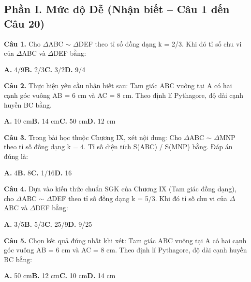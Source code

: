 \documentclass[11pt,a4paper]{article}
\begin{document}
\subsection*{\color{accent} Phần I. Mức độ Dễ (Nhận biết -- Câu 1 đến Câu 20)}
\textbf{\color{primary} Câu 1.} Cho $\Delta$ABC $\sim$ $\Delta$DEF theo tỉ số đồng dạng k = 2/3. Khi đó tỉ số chu vi của $\Delta$ABC và $\Delta$DEF bằng:\par
\hspace*{1.5em}\textbf{A.} 4/9\quad\quad \textbf{B.} 2/3\quad\quad \textbf{C.} 3/2\quad\quad \textbf{D.} 9/4\par\vspace{2pt}
\textbf{\color{primary} Câu 2.} Thực hiện yêu cầu nhận biết sau: Tam giác ABC vuông tại A có hai cạnh góc vuông AB = 6 cm và AC = 8 cm. Theo định lí Pythagore, độ dài cạnh huyền BC bằng.\par
\hspace*{1.5em}\textbf{A.} 10 cm\quad\quad \textbf{B.} 14 cm\quad\quad \textbf{C.} 50 cm\quad\quad \textbf{D.} 12 cm\par\vspace{2pt}
\textbf{\color{primary} Câu 3.} Trong bài học thuộc Chương IX, xét nội dung: Cho $\Delta$ABC $\sim$ $\Delta$MNP theo tỉ số đồng dạng k = 4. Tỉ số diện tích S(ABC) / S(MNP) bằng. Đáp án đúng là:\par
\hspace*{1.5em}\textbf{A.} 4\quad\quad \textbf{B.} 8\quad\quad \textbf{C.} 1/16\quad\quad \textbf{D.} 16\par\vspace{2pt}
\textbf{\color{primary} Câu 4.} Dựa vào kiến thức chuẩn SGK của Chương IX (Tam giác đồng dạng), cho $\Delta$ABC $\sim$ $\Delta$DEF theo tỉ số đồng dạng k = 5/3. Khi đó tỉ số chu vi của $\Delta$ABC và $\Delta$DEF bằng:\par
\hspace*{1.5em}\textbf{A.} 3/5\quad\quad \textbf{B.} 5/3\quad\quad \textbf{C.} 25/9\quad\quad \textbf{D.} 9/25\par\vspace{2pt}
\textbf{\color{primary} Câu 5.} Chọn kết quả đúng nhất khi xét: Tam giác ABC vuông tại A có hai cạnh góc vuông AB = 6 cm và AC = 8 cm. Theo định lí Pythagore, độ dài cạnh huyền BC bằng:\par
\hspace*{1.5em}\textbf{A.} 50 cm\quad\quad \textbf{B.} 12 cm\quad\quad \textbf{C.} 10 cm\quad\quad \textbf{D.} 14 cm\par\vspace{2pt}
\end{document}
